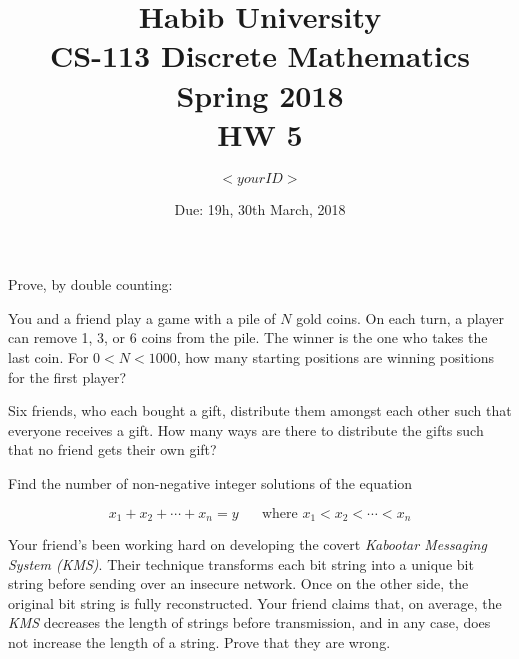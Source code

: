 \documentclass[addpoints]{exam}
\title{Habib University\\CS-113 Discrete Mathematics\\Spring 2018\\HW 5}
\author{$<your ID>$}  %
\date{Due: 19h, 30th March, 2018}
\begin{document}
\maketitle

\begin{questions}



\question
Prove, by double counting:

\question  You and a friend play a game with a pile of $N$ gold coins. On each turn, a player can remove 1, 3, or 6 coins from the pile. The winner is the one who takes the last coin. For $0 < N < 1000$, how many starting positions are winning positions for the first player?


  \begin{solution}
  \end{solution}
  
\question 
Six friends, who each bought a gift, distribute them amongst each other such that everyone receives a gift. How many ways are there to distribute the gifts such that no friend gets their own gift?



  \begin{solution}
  \end{solution}

\question
Find the number of non-negative integer solutions of the equation

\[x_1 + x_2 + \cdots + x_n = y \;\;\;\;\;\;\text{where } x_1 < x_2 < \cdots < x_n\]

    
   \begin{solution}
  \end{solution}

\question 
Your friend's been working hard on developing the covert \textit{Kabootar Messaging System (KMS)}. Their technique transforms each bit string into a unique bit string before sending over an insecure network. Once on the other side, the original bit string is fully reconstructed. Your friend claims that, on average, the \textit{KMS} decreases the length of strings before transmission, and in any case, does not increase the length of a string. Prove that they are wrong.

\end{questions}
\end{document}
